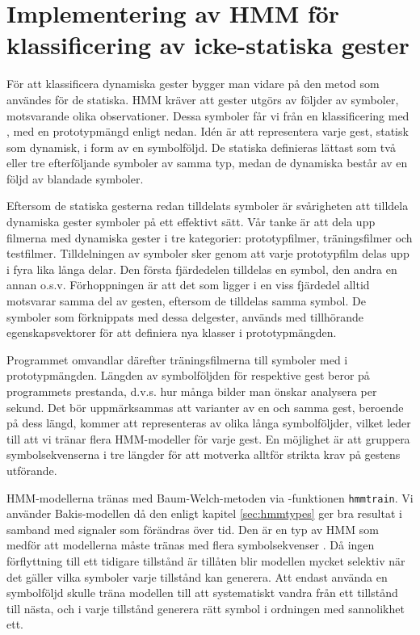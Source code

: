 \documentclass[../rapport_MVEX01-11-05]{subfiles}
\begin{document}
\section{Implementering av HMM för klassificering av icke-statiska gester}
För att klassificera dynamiska gester bygger man vidare på den metod som användes
för de statiska.  HMM kräver att gester utgörs av följder av symboler,
motsvarande olika observationer. Dessa symboler får vi från en 
klassificering med \knn, med en prototypmängd enligt nedan.
Idén är att representera varje gest, statisk som dynamisk, i form av en
symbolföljd.  De statiska definieras lättast som två eller tre efterföljande
symboler av samma typ, medan de dynamiska består av en följd av blandade
symboler.

Eftersom de statiska gesterna redan tilldelats
symboler är svårigheten att tilldela dynamiska gester symboler på ett effektivt sätt. Vår tanke
är att dela upp filmerna med dynamiska gester i tre kategorier: prototypfilmer, träningsfilmer och 
testfilmer. Tilldelningen av symboler sker genom att varje prototypfilm
delas upp i fyra lika långa delar. Den 
första fjärdedelen tilldelas en symbol, den andra en annan o.s.v.
Förhoppningen är att det som ligger i en viss fjärdedel alltid motsvarar samma
del av gesten, eftersom de tilldelas samma symbol.
De symboler som förknippats med dessa delgester, används med
tillhörande egenskapsvektorer för att definiera nya klasser i prototypmängden.

Programmet omvandlar därefter träningsfilmerna till symboler med \knn i
prototypmängden.
Längden av 
symbolföljden för respektive gest beror på programmets prestanda, d.v.s. hur många bilder 
man önskar analysera per sekund. Det bör uppmärksammas att varianter av en och
samma gest,
beroende på dess längd, kommer att representeras av olika långa symbolföljder,
vilket leder till att vi tränar flera HMM-modeller för varje gest.
En möjlighet är att gruppera symbolsekvenserna 
i tre längder för att motverka alltför strikta krav på gestens utförande. 

HMM-modellerna tränas med Baum-Welch-metoden via \MATLAB-funktionen \texttt{hmmtrain}.
Vi använder Bakis-modellen då den enligt kapitel \ref{sec:hmmtypes}
ger bra resultat i samband med signaler som förändras över tid.
Den är en typ av HMM som medför att
modellerna måste tränas med flera symbolsekvenser \cite{Rabiner89}.
Då ingen förflyttning till ett tidigare
tillstånd är tillåten blir modellen mycket selektiv när det gäller
vilka symboler varje tillstånd kan generera. 
Att endast använda en symbolföljd skulle träna modellen till att systematiskt
vandra från ett tillstånd till nästa,
och i varje tillstånd generera rätt symbol i ordningen med sannolikhet ett.
\end{document}
